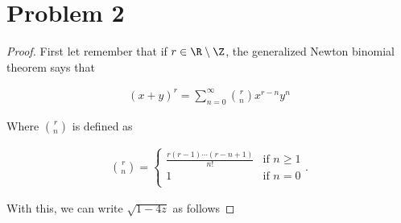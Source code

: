 ﻿\section{Problem 2}

\begin{proof}
    First let remember that if $r \in \R \setminus \Z$, the generalized Newton binomial theorem says that
    
    \begin{align}
            (x + y)^r = \sum_{n = 0}^{\infty} \binom{r}{n} x^{r-n} y^{n}
    \end{align}\pn
    
    Where $\binom{r}{n}$ is defined as
    
    \begin{align}
            \binom{r}{n} = \begin{cases}
                                \frac{r(r-1)\cdots(r-n+1)}{n!} & \text{if } n \geq 1   \\
                                1                              & \text{if } n = 0   \\
                           \end{cases}.
    \end{align}\pn
    
    
    
    With this, we can write $\sqrt{1 - 4z}$ as follows
    

\end{proof}
